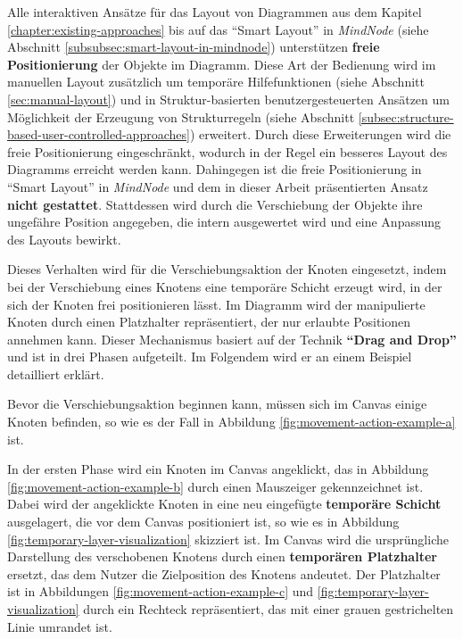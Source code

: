 Alle interaktiven Ansätze für das Layout von Diagrammen aus dem Kapitel \ref{chapter:existing-approaches} bis auf das \enquote{Smart Layout} in \textit{MindNode} (siehe Abschnitt \ref{subsubsec:smart-layout-in-mindnode}) unterstützen \textbf{freie Positionierung} der Objekte im Diagramm. Diese Art der Bedienung wird im manuellen Layout zusätzlich um temporäre Hilfefunktionen (siehe Abschnitt \ref{sec:manual-layout}) und in Struktur-basierten benutzergesteuerten Ansätzen um Möglichkeit der Erzeugung von Strukturregeln (siehe Abschnitt \ref{subsec:structure-based-user-controlled-approaches}) erweitert. Durch diese Erweiterungen wird die freie Positionierung eingeschränkt, wodurch in der Regel ein besseres Layout des Diagramms erreicht werden kann. Dahingegen ist die freie Positionierung in \enquote{Smart Layout} in \textit{MindNode} und dem in dieser Arbeit präsentierten Ansatz \textbf{nicht gestattet}. Stattdessen wird durch die Verschiebung der Objekte ihre ungefähre Position angegeben, die intern ausgewertet wird und eine Anpassung des Layouts bewirkt.

Dieses Verhalten wird für die Verschiebungsaktion der Knoten eingesetzt, indem bei der Verschiebung eines Knotens eine temporäre Schicht erzeugt wird, in der sich der Knoten frei positionieren lässt. Im Diagramm wird der manipulierte Knoten durch einen Platzhalter repräsentiert, der nur erlaubte Positionen annehmen kann. Dieser Mechanismus basiert auf der Technik \textbf{\enquote{Drag and Drop}} und ist in drei Phasen aufgeteilt. Im Folgendem wird er an einem Beispiel detailliert erklärt.

Bevor die Verschiebungsaktion beginnen kann, müssen sich im Canvas einige Knoten befinden, so wie es der Fall in Abbildung \ref{fig:movement-action-example-a} ist.

In der ersten Phase wird ein Knoten im Canvas angeklickt, das in Abbildung \ref{fig:movement-action-example-b} durch einen Mauszeiger gekennzeichnet ist. Dabei wird der angeklickte Knoten in eine neu eingefügte \textbf{temporäre Schicht} ausgelagert, die vor dem Canvas positioniert ist, so wie es in Abbildung \ref{fig:temporary-layer-visualization} skizziert ist. Im Canvas wird die ursprüngliche Darstellung des verschobenen Knotens durch einen \textbf{temporären Platzhalter} ersetzt, das dem Nutzer die Zielposition des Knotens andeutet. Der Platzhalter ist in Abbildungen \ref{fig:movement-action-example-c} und \ref{fig:temporary-layer-visualization} durch ein Rechteck repräsentiert, das mit einer grauen gestrichelten Linie umrandet ist.

